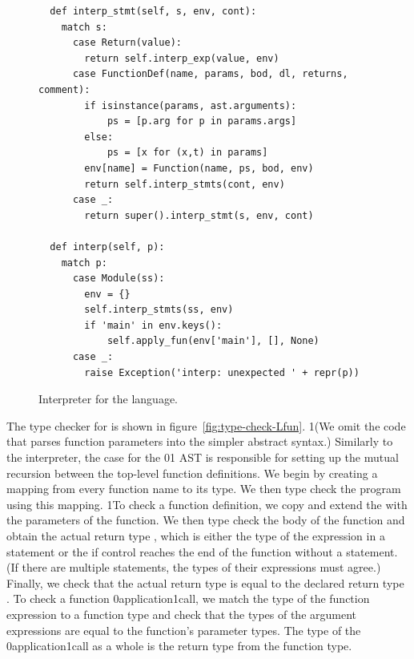 \documentclass[7x10]{TimesAPriori_MIT}%
\def\racketEd{0}
\def\pythonEd{1}
\def\edition{1}
\newcommand{\racket}[1]{{\if\edition\racketEd{#1}\fi}}
\newcommand{\pythonColor}[0]{}
\newcommand{\python}[1]{{\if\edition\pythonEd\pythonColor #1\fi}}
\numberwithin{theorem}{chapter}
\numberwithin{definition}{chapter}
\numberwithin{equation}{chapter}
\begin{document}
\begin{figure}[tp]
\begin{tcolorbox}[colback=white]
{\begin{lstlisting}
  def interp_stmt(self, s, env, cont):
    match s:
      case Return(value):
        return self.interp_exp(value, env)
      case FunctionDef(name, params, bod, dl, returns, comment):
        if isinstance(params, ast.arguments):
            ps = [p.arg for p in params.args]
        else:
            ps = [x for (x,t) in params]
        env[name] = Function(name, ps, bod, env)
        return self.interp_stmts(cont, env)
      case _:
        return super().interp_stmt(s, env, cont)
    
  def interp(self, p):
    match p:
      case Module(ss):
        env = {}
        self.interp_stmts(ss, env)
        if 'main' in env.keys():
            self.apply_fun(env['main'], [], None)
      case _:
        raise Exception('interp: unexpected ' + repr(p))
\end{lstlisting}
\fi}
  \end{tcolorbox}

  \caption{Interpreter for the \LangFun{} language.}
\label{fig:interp-Lfun}
\end{figure}



The type checker for \LangFun{} is shown in
figure~\ref{fig:type-check-Lfun}.
%
\python{(We omit the code that parses function parameters into the
  simpler abstract syntax.)}
%
Similarly to the interpreter, the case for the
\racket{}\python{}
%
AST is responsible for setting up the mutual recursion between the
top-level function definitions. We begin by creating a mapping
 from every function name to its type. We then type check
the program using this mapping.
%
\python{To check a function definition, we copy and extend the
  \code{env} with the parameters of the function. We then type check
  the body of the function and obtain the actual return type
  \code{rt}, which is either the type of the expression in a
  \code{return} statement or the \code{VoidType} if control reaches
  the end of the function without a \code{return} statement.  (If
  there are multiple \code{return} statements, the types of their
  expressions must agree.) Finally, we check that the actual return
  type \code{rt} is equal to the declared return type \code{returns}.}
%
To check a function \racket{application}\python{call}, we match
the type of the function expression to a function type and check that
the types of the argument expressions are equal to the function's
parameter types. The type of the \racket{application}\python{call} as
a whole is the return type from the function type.
\end{document}
